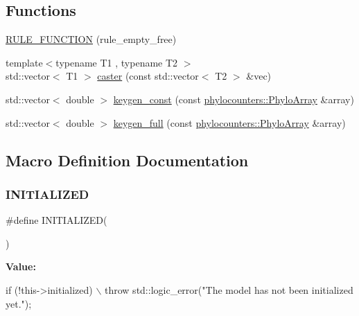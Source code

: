 \subsection*{Functions}
\begin{DoxyCompactItemize}
\item 
\hyperlink{aphylomodel-bones_8hpp_a11c7dd7dca27f32547bb602f30ceb5e8}{R\+U\+L\+E\+\_\+\+F\+U\+N\+C\+T\+I\+ON} (rule\+\_\+empty\+\_\+free)
\item 
{\footnotesize template$<$typename T1 , typename T2 $>$ }\\std\+::vector$<$ T1 $>$ \hyperlink{aphylomodel-bones_8hpp_a1f293b9028bf34b1aa8506c8f0af4413}{caster} (const std\+::vector$<$ T2 $>$ \&vec)
\item 
std\+::vector$<$ double $>$ \hyperlink{aphylomodel-bones_8hpp_a513c16e4b1a39f810501041e7b8fa448}{keygen\+\_\+const} (const \hyperlink{namespacebarry_1_1counters_1_1phylo_abd293bf65e494e903639fb5fb2c91604}{phylocounters\+::\+Phylo\+Array} \&array)
\item 
std\+::vector$<$ double $>$ \hyperlink{aphylomodel-bones_8hpp_aa60134cca317d64e4b3d1707380d5d0d}{keygen\+\_\+full} (const \hyperlink{namespacebarry_1_1counters_1_1phylo_abd293bf65e494e903639fb5fb2c91604}{phylocounters\+::\+Phylo\+Array} \&array)
\end{DoxyCompactItemize}


\subsection{Macro Definition Documentation}
\mbox{\label{aphylomodel-bones_8hpp_a08888c91f4cab1da64c8f8bf10b59c40}} 
\subsubsection{\texorpdfstring{I\+N\+I\+T\+I\+A\+L\+I\+Z\+ED}{INITIALIZED}}
{\footnotesize\ttfamily \#define I\+N\+I\+T\+I\+A\+L\+I\+Z\+ED(\begin{DoxyParamCaption}{ }\end{DoxyParamCaption})}

{\bfseries Value\+:}
\begin{DoxyCode}
\textcolor{keywordflow}{if} (!this->initialized) \(\backslash\)
    throw std::logic\_error(\textcolor{stringliteral}{"The model has not been initialized yet."});
\end{DoxyCode}


